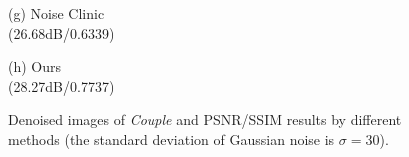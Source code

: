 \documentclass[runningheads]{llncs}
\begin{document}
\begin{figure}
{\begin{minipage}[t]{0.244\textwidth}
{\footnotesize (g) Noise Clinic \\(26.68dB/0.6339)}
\end{minipage}
\begin{minipage}[t]{0.244\textwidth}
\centering
{}
{\footnotesize (h) Ours \\(28.27dB/0.7737)}
\end{minipage}
}
\caption{Denoised images of \textsl{Couple} and PSNR/SSIM results by different methods (the standard deviation of Gaussian noise is $\sigma=30$).}
\label{fig1}
\end{figure}
\end{document}
